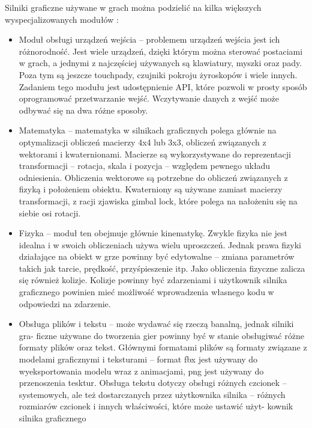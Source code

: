 \documentclass[12pt,twoside]{article}
\begin{document}
Silniki graficzne używane w grach można podzielić na kilka większych
wyspecjalizowanych modułów \cite{GameEngineArchitecture}:
\begin{itemize}
\item Moduł obsługi urządzeń wejścia -- problemem urządzeń wejścia jest
ich różnorodność. Jest wiele urządzeń, dzięki którym można sterować postaciami w
grach, a jednymi z najczęściej używanych są klawiatury, myszki oraz pady. Poza
tym są jeszcze touchpady, czujniki pokroju żyroskopów i wiele innych. Zadaniem
tego modułu jest udostępnienie API, które pozwoli w prosty sposób oprogramować
przetwarzanie wejść. Wczytywanie danych z wejść może odbywać się na dwa różne
sposoby.

\item Matematyka -- matematyka w silnikach graficznych polega głównie
na optymalizacji obliczeń macierzy 4x4 lub 3x3, obliczeń związanych z wektorami
i kwaternionami. Macierze są wykorzystywane do reprezentacji transformacji
-- rotacja, skala i pozycja -- względem pewnego układu
odniesienia. Obliczenia wektorowe są potrzebne do obliczeń związanych z fizyką i
położeniem obiektu. Kwaterniony są używane zamiast macierzy transformacji, z
racji zjawiska gimbal lock, które polega na nałożeniu się na siebie osi rotacji.  

\item Fizyka\cite{GameDevelpomenPhysics} -- moduł ten obejmuje głównie kinematykę. Zwykle fizyka
nie jest idealna i w swoich obliczeniach używa wielu uproszczeń. Jednak prawa
fizyki działające na obiekt w grze powinny być edytowalne -- zmiana
parametrów takich jak tarcie, prędkość, przyśpieszenie itp.
Jako obliczenia fizyczne zalicza się również kolizje. Kolizje powinny być
zdarzeniami i użytkownik silnika graficznego powinien mieć możliwość
wprowadzenia własnego kodu w odpowiedzi na zdarzenie.  

\item Obsługa plików i tekstu – może wydawać się rzeczą banalną, jednak silniki
gra- ficzne używane do tworzenia gier powinny być w stanie obsługiwać różne
formaty plików oraz tekst. Głównymi formatami plików są formaty związane z
modelami graficznymi i teksturami – format fbx jest używany do wyeksportowania
modelu wraz z animacjami, png jest używany do przenoszenia tesktur. Obsługa
tekstu dotyczy obsługi różnych czcionek – systemowych, ale też dostarczanych
przez użytkownika silnika – różnych rozmiarów czcionek i innych właściwości,
które może ustawić użyt- kownik silnika graficznego
 


\end{itemize}
\end{document}
